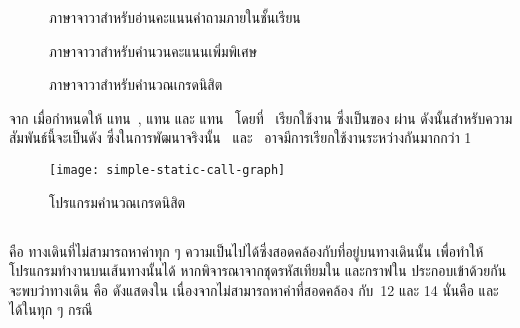 {{\begin{figure}[ht!]
    \lstset{basicstyle=\small,style=thesiscodestyle,language=java}
    
    \caption{{\sourcecode}ภาษาจาวาสำหรับอ่านคะแนนคำถามภายในชั้นเรียน}
    \label{fig:javaQuiz}
\end{figure}

\begin{figure}[ht!]
    \lstset{basicstyle=\small,style=thesiscodestyle,language=java}
    
    \caption{{\sourcecode}ภาษาจาวาสำหรับคำนวนคะแนนเพิ่มพิเศษ}
    \label{fig:javaBonusScore}
\end{figure}

\begin{figure}[ht!]
    \lstset{basicstyle=\small,style=thesiscodestyle}
    
    \caption{{\sourcecode}ภาษาจาวาสำหรับคำนวณเกรดนิสิต}
    \label{fig:javaGrading}
\end{figure}

\clearpage
จาก เมื่อกำหนดให้  แทน\class\ ,  แทน{\class}  
และ  แทน\class\  โดยที่\class\  เรียกใช้งาน{\method}  
ซึ่งเป็น{\method}ของ{\class}  ผ่าน{\method} {} ดังนั้น{\scg}สำหรับความสัมพันธ์นี้จะเป็นดัง
{} ซึ่งในการพัฒนาจริงนั้น\class\  และ\class\ 
อาจมีการเรียกใช้งานระหว่างกันมากกว่า 1 \method %

\begin{figure}[htb!]
    \centering
    \texttt{[image: simple-static-call-graph]}
    \caption{{\scg}โปรแกรมคำนวณเกรดนิสิต}
    \label{fig:scggrading}
\end{figure}

\subsection{\FirstTimeDefine{\InfeasiblePath}{\InfeasiblePathEN}}

\InfeasiblePath คือ ทางเดินที่ไม่สามารถหาค่าทุก ๆ ความเป็นไปได้ซึ่งสอดคล้องกับ{\PredicateNode}ที่อยู่บนทางเดินนั้น 
เพื่อทำให้โปรแกรมทำงานบนเส้นทางนั้นได้ \cite{Naik2008} หากพิจารณาจากชุดรหัสเทียมใน{} 
และกราฟใน{} ประกอบเข้าด้วยกัน จะพบว่าทางเดิน 
 คือ {\bf \InfeasiblePath} 
ดังแสดงใน{} เนื่องจากไม่สามารถหาค่าที่สอดคล้อง กับ\PredicateNode\ 12 และ 14 
นั่นคือ  และ  ได้ในทุก ๆ กรณี

}}
